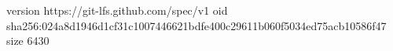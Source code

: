 version https://git-lfs.github.com/spec/v1
oid sha256:024a8d1946d1cf31c1007446621bdfe400c29611b060f5034ed75acb10586f47
size 6430
